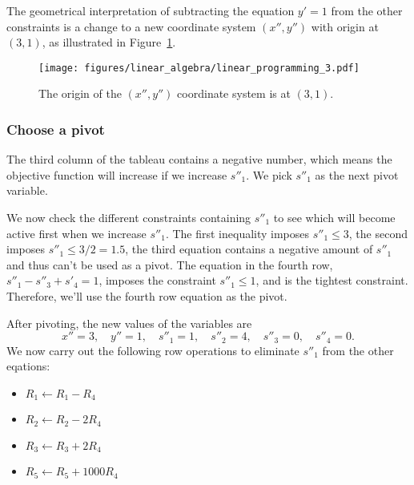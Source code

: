 \documentclass[11pt,oneside]{article}
\begin{document}
		\noindent
		The geometrical interpretation of subtracting the equation $y'=1$ from the other constraints
		is a change to a new coordinate system $(x'',y'')$ with origin at $(3,1)$,
		as illustrated in Figure~\ref{fig:linear_programming_3}.
		
		\begin{figure}[htb]
		\begin{center}
		\texttt{[image: figures/linear\_algebra/linear\_programming\_3.pdf]}
		\end{center}
		\vspace{-6mm}
		\caption{The origin of the $(x'',y'')$ coordinate system is at $(3,1)$.}
		\label{fig:linear_programming_3}
		\end{figure}

		

	\subsubsection{Choose a pivot}
	
		The third column of the tableau contains a negative number,
		which means the objective function will increase if we increase $s''_1$.
		We pick $s''_1$ as the next pivot variable.
		
		We now check the different constraints containing $s''_1$ to see which will become
		active first when we increase $s''_1$.
		The first inequality imposes $s''_1 \leq 3$,
		the second imposes $s''_1 \leq 3/2=1.5$,
		the third equation contains a negative amount of $s''_1$ and thus can't be used as a pivot.
		The equation in the fourth row, $s''_1 -s''_3 + s'_4 = 1$,
		imposes the constraint $s''_1 \leq 1$,
		and is the tightest constraint.
		Therefore, we'll use the fourth row equation as the pivot.
		
		After pivoting, the new values of the variables are
		\[
			x''=3, \quad y''=1, \quad s''_1=1, \quad s''_2=4,  \quad s''_3=0, \quad s''_4=0.
		\]
		We now carry out the following row operations to eliminate $s''_1$ from the other eqations:
		\begin{itemize}
			\item $R_1 \gets R_1 - R_4$
			\item $R_2 \gets R_2 - 2R_4$
			\item $R_3 \gets R_3 + 2R_4$
			\item $R_5 \gets R_5 + 1000R_4$
		\end{itemize}				
\end{document}
